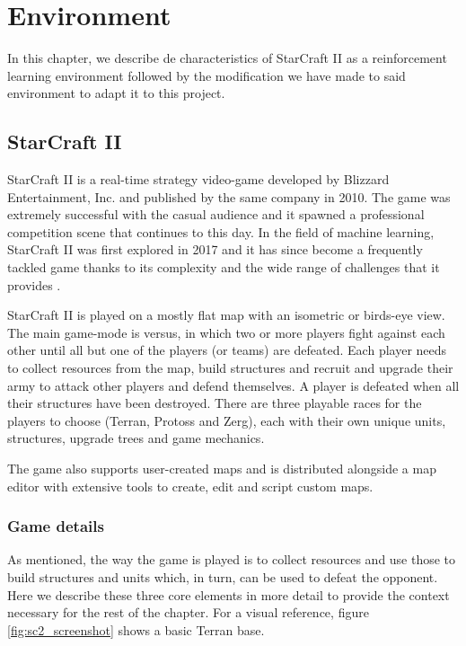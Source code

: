 \chapter{Environment}
\label{chapter:environment}

In this chapter, we describe de characteristics of StarCraft II as a reinforcement learning environment followed by the modification we have made to said environment to adapt it to this project.

\section{StarCraft II}

StarCraft II is a real-time strategy video-game developed by Blizzard Entertainment, Inc. and published by the same company in 2010. The game was extremely successful with the casual audience and it spawned a professional competition scene that continues to this day. In the field of machine learning, StarCraft II was first explored in 2017 \cite{Vinyals:2017} and it has since become a frequently tackled game thanks to its complexity and the wide range of challenges that it provides \cite{Tang:2018}.

StarCraft II is played on a mostly flat map with an isometric or birds-eye view. The main game-mode is versus, in which two or more players fight against each other until all but one of the players (or teams) are defeated. Each player needs to collect resources from the map, build structures and recruit and upgrade their army to attack other players and defend themselves. A player is defeated when all their structures have been destroyed. There are three playable races for the players to choose (Terran, Protoss and Zerg), each with their own unique units, structures, upgrade trees and game mechanics.

The game also supports user-created maps and is distributed alongside a map editor with extensive tools to create, edit and script custom maps.

\subsection{Game details}

As mentioned, the way the game is played is to collect resources and use those to build structures and units which, in turn, can be used to defeat the opponent. Here we describe these three core elements in more detail to provide the context necessary for the rest of the chapter. For a visual reference, figure \ref{fig:sc2_screenshot} shows a basic Terran base.

